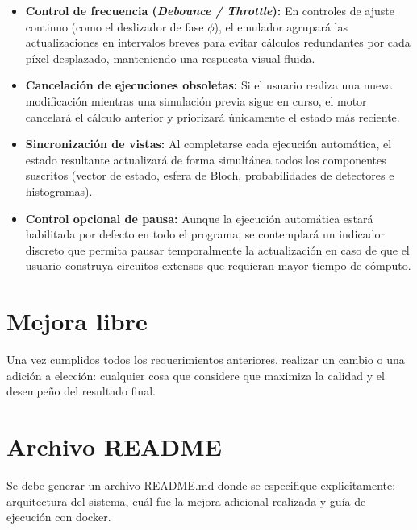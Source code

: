\documentclass{article}
\begin{document}
\begin{itemize}
    \item \textbf{Control de frecuencia (\textit{Debounce / Throttle}):} En controles de ajuste continuo (como el deslizador de fase $\phi$), el emulador agrupará las actualizaciones en intervalos breves para evitar cálculos redundantes por cada píxel desplazado, manteniendo una respuesta visual fluida.
    \item \textbf{Cancelación de ejecuciones obsoletas:} Si el usuario realiza una nueva modificación mientras una simulación previa sigue en curso, el motor cancelará el cálculo anterior y priorizará únicamente el estado más reciente.
    \item \textbf{Sincronización de vistas:} Al completarse cada ejecución automática, el estado resultante actualizará de forma simultánea todos los componentes suscritos (vector de estado, esfera de Bloch, probabilidades de detectores e histogramas).
    \item \textbf{Control opcional de pausa:} Aunque la ejecución automática estará habilitada por defecto en todo el programa, se contemplará un indicador discreto que permita pausar temporalmente la actualización en caso de que el usuario construya circuitos extensos que requieran mayor tiempo de cómputo.
\end{itemize}

\section{Mejora libre}
Una vez cumplidos todos los requerimientos anteriores, realizar un cambio o una adición a elección: cualquier cosa que considere que maximiza la calidad y el desempeño del resultado final.

\section{Archivo README}
Se debe generar un archivo README.md donde se especifique explicitamente: arquitectura del sistema, cuál fue la mejora adicional realizada y guía de ejecución con docker.
\end{document}

